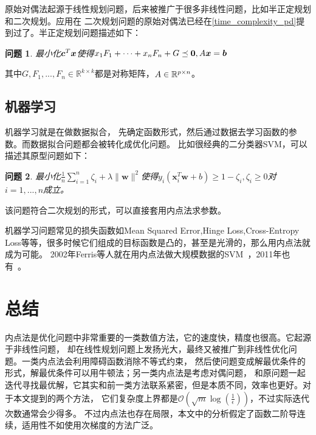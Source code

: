 \documentclass{article}
\newtheorem{problem}{问题}
\begin{document}
原始对偶法起源于线性规划问题，后来被推广于很多非线性问题，比如半正定规划和二次规划。应用在
二次规划问题的原始对偶法已经在\ref{time_complexity_pd}提到过了。半正定规划问题描述如下：
\newcommand{\bF}{F}
\newcommand{\bG}{G}
\begin{problem}
    最小化$\bm c^T\bm x$使得$x_1\bF _1+\dots+x_n\bF _n+\bG\preceq \bm 0,\bA \bx = \bb$
\end{problem}
其中$\bG,\bF _1,...,\bF _n\in\mathbb{R}^{k\times k}$都是对称矩阵，$A\in\mathbb{R}^{p\times n}$。
\subsection{机器学习}
机器学习就是在做数据拟合，
先确定函数形式，然后通过数据去学习函数的参数。而数据拟合问题都会被转化成优化问题。
比如很经典的二分类器SVM，可以描述其原型问题如下：
\begin{problem}
    最小化$\frac{1}{n}\sum\limits_{i=1}^n\zeta_i+\lambda\|\bm w\|^2$使得$y_i(\bm x_i^T\bm w+b)\ge1-\zeta_i,\zeta_i\ge0$对$i=1,...,n$成立。
\end{problem}
该问题符合二次规划的形式，可以直接套用内点法求参数。

机器学习问题常见的损失函数如Mean Squared Error,Hinge Loss,Cross-Entropy Loss等等，很多时候它们组成的目标函数是凸的，甚至是光滑的，那么用内点法就成为可能。
2002年Ferris等人就在用内点法做大规模数据的SVM~\cite{ferris2002interior}，2011年也有~\cite{woodsend2011exploiting}。

\section{总结}
内点法是优化问题中非常重要的一类数值方法，它的速度快，精度也很高。它起源于非线性问题，
却在线性规划问题上发扬光大，最终又被推广到非线性优化问题。一类内点法会利用障碍函数消除不等式约束，
然后使问题变成解最优条件的形式，解最优条件可以用牛顿法；另一类内点法是考虑对偶问题，
和原问题一起迭代寻找最优解，它其实和前一类方法联系紧密，但是本质不同，效率也更好。对于本文提到的两个方法，
它们复杂度上界都是$\mathcal O(\sqrt m\log(\frac{1}{\epsilon}))$，不过实际迭代次数通常会少得多。
不过内点法也存在局限，本文中的分析假定了函数二阶导连续，适用性不如使用次梯度的方法广泛。


{}

\end{document}
